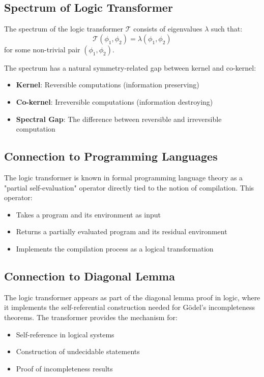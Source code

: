 \subsection{Spectrum of Logic Transformer}

\begin{definition}
\label{def:logic-spectrum}
The spectrum of the logic transformer $\mathcal{T}$ consists of eigenvalues $\lambda$ such that:
\[
\mathcal{T}(\phi_1, \phi_2) = \lambda (\phi_1, \phi_2)
\]
for some non-trivial pair $(\phi_1, \phi_2)$.

The spectrum has a natural symmetry-related gap between kernel and co-kernel:
\begin{itemize}
\item \textbf{Kernel}: Reversible computations (information preserving)
\item \textbf{Co-kernel}: Irreversible computations (information destroying)
\item \textbf{Spectral Gap}: The difference between reversible and irreversible computation
\end{itemize}
\end{definition}

\subsection{Connection to Programming Languages}

\begin{remark}
\label{rem:partial-self-evaluation}
The logic transformer is known in formal programming language theory as a "partial self-evaluation" operator directly tied to the notion of compilation. This operator:
\begin{itemize}
\item Takes a program and its environment as input
\item Returns a partially evaluated program and its residual environment
\item Implements the compilation process as a logical transformation
\end{itemize}
\end{remark}

\subsection{Connection to Diagonal Lemma}

\begin{remark}
\label{rem:diagonal-lemma}
The logic transformer appears as part of the diagonal lemma proof in logic, where it implements the self-referential construction needed for Gödel's incompleteness theorems. The transformer provides the mechanism for:
\begin{itemize}
\item Self-reference in logical systems
\item Construction of undecidable statements
\item Proof of incompleteness results
\end{itemize}
\end{remark}

